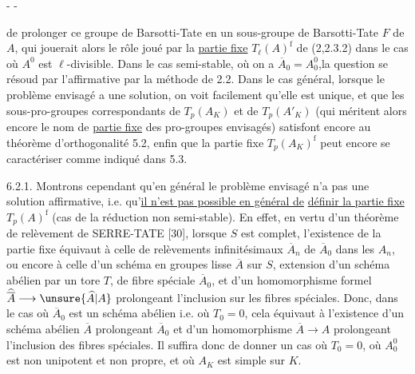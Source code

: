 -  - 

de prolonger ce groupe de Barsotti-Tate en un sous-groupe de Barsotti-Tate
\(F\) de \(A\), qui jouerait alors le rôle joué par la \uline{partie fixe}
\(T_\ell(A)^{\mathrm f}\) de (2,2.3.2) dans le cas où \(A^0\) est
\(\ell\)-divisible. Dans le cas semi-stable, où on a \(\overline A_0=A_0^0\),la
question se résoud par l'affirmative par la méthode de 2.2. Dans le cas général,
lorsque le problème envisagé a une solution, on voit facilement qu'elle est
unique, et que les sous-pro-groupes correspondants de \(T_p(A_K)\) et de
\(T_p(A'_K)\) (qui méritent alors encore le nom de \uline{partie fixe} des
pro-groupes envisagés) satisfont encore au théorème d'orthogonalité 5.2, enfin que
la partie fixe \(T_p(A_K)^{\mathrm f}\) peut encore se caractériser comme indiqué
dans 5.3.

6.2.1. Montrons cependant qu'en général le problème envisagé n'a pas une
solution affirmative, i.e. qu'\uline{il n'est pas possible en général de}
\uline{définir la partie fixe} \(T_p(A)^{\mathrm f}\) (cas de la réduction non
semi-stable). En effet, en vertu d'un théorème de relèvement de SERRE-TATE [30],
lorsque \(S\) est complet, l'existence de la partie fixe équivaut à celle de
relèvements infinitésimaux \(\overline A_n\) de \(\overline A_0\) dans les
\(A_n\), ou encore à celle d'un schéma en groupes lisse \(\overline A\) sur
\(S\), extension d'un schéma abélien par un tore \(T\), de fibre spéciale
\(\overline A_0\), et d'un homomorphisme formel
\(\widehat{\overline A}\longrightarrow\unsure{\widehat A|A}\) prolongeant
l'inclusion sur les fibres spéciales. Donc, dans le cas où \(\overline A_0\)
est un schéma abélien i.e. où \(T_0=0\), cela équivaut à l'existence d'un schéma
abélien \(\overline A\) prolongeant \(\overline A_0\) et d'un homomorphisme
\(\overline A\longrightarrow A\) prolongeant l'inclusion des fibres spéciales.
Il suffira donc de donner un cas où \(T_0=0\), où \(A_0^0\) est non unipotent
et non propre, et où \(A_K\) est simple sur \(K\).
